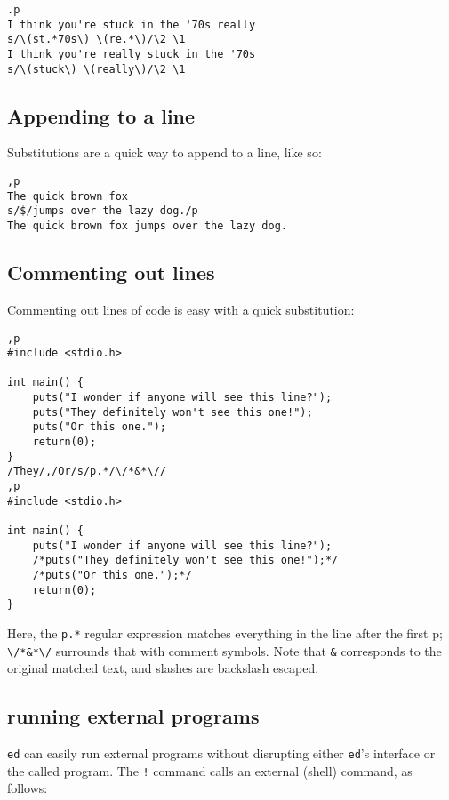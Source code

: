 \documentclass[12pt]{article}
\begin{document}
\begin{lstlisting}
.p
I think you're stuck in the '70s really
s/\(st.*70s\) \(re.*\)/\2 \1
I think you're really stuck in the '70s
s/\(stuck\) \(really\)/\2 \1
\end{lstlisting}

\subsection{Appending to a line}

Substitutions are a quick way to append to a line, like so:

\begin{lstlisting}
,p
The quick brown fox
s/$/jumps over the lazy dog./p
The quick brown fox jumps over the lazy dog.
\end{lstlisting}

\subsection{Commenting out lines}

Commenting out lines of code is easy with a quick substitution:

\begin{lstlisting}
,p
#include <stdio.h>

int main() {
    puts("I wonder if anyone will see this line?");
    puts("They definitely won't see this one!");
    puts("Or this one.");
    return(0);
}
/They/,/Or/s/p.*/\/*&*\//
,p
#include <stdio.h>

int main() {
    puts("I wonder if anyone will see this line?");
    /*puts("They definitely won't see this one!");*/
    /*puts("Or this one.");*/
    return(0);
}
\end{lstlisting}

Here, the \lstinline{p.*} regular expression matches everything in the line after the first p; \lstinline{\/*&*\/}
surrounds that with comment symbols. Note that \lstinline{&} corresponds to the original matched text, and
slashes are backslash escaped.

\subsection{running external programs}

\lstinline{ed} can easily run external programs without disrupting either \lstinline{ed}'s
interface or the called program. The \lstinline{!} command calls an external (shell) command, as follows:
\end{document}
